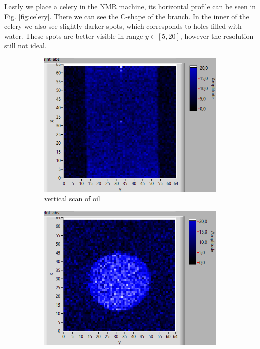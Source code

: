 Lastly we place a celery in the NMR machine, its horizontal profile can be seen in Fig. \ref{fig:celery}. There we can see the C-shape of the branch. In the inner of the celery we also see slightly darker spots, which corresponds to holes filled with water. These spots are better visible in range $y \in [5, 20]$, however the resolution still not ideal. 
\begin{figure}[ht]
    \centering
    \begin{subfigure}[b]{0.45\textwidth}
        \centering
        \includegraphics[width=\textwidth]{./Latex images/oil_vertical.png}
        \caption{ vertical scan of oil}
        \label{fig:oil vertical}
    \end{subfigure}
    \hfill
    \begin{subfigure}[b]{0.45\textwidth}
        \centering
        \includegraphics[width=\textwidth]{./Latex images/oil_horizontal.png}

\end{subfigure}
\end{figure}
